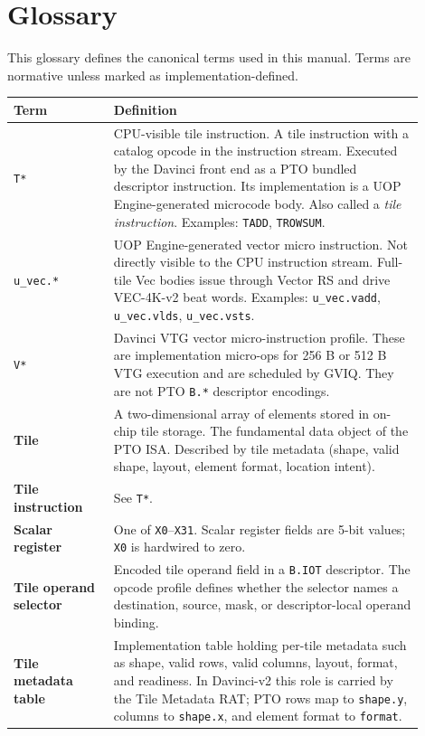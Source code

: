 \chapter{Glossary}
\label{chap:glossary}
\label{sec:glossary}
This glossary defines the canonical terms used in this manual. Terms are normative unless marked as implementation-defined.

\begin{longtable}{@{}L{0.22\linewidth}L{0.68\linewidth}@{}}
\toprule
Term & Definition \\
\midrule
\texttt{T*} & CPU-visible tile instruction. A tile instruction with a catalog opcode in the instruction stream. Executed by the Davinci front end as a PTO bundled descriptor instruction. Its implementation is a UOP Engine-generated microcode body. Also called a \textit{tile instruction}. Examples: \texttt{TADD}, \texttt{TROWSUM}. \\
\texttt{u\_vec.*} & UOP Engine-generated vector micro instruction. Not directly visible to the CPU instruction stream. Full-tile Vec bodies issue through Vector RS and drive VEC-4K-v2 beat words. Examples: \texttt{u\_vec.vadd}, \texttt{u\_vec.vlds}, \texttt{u\_vec.vsts}. \\
\texttt{V*} & Davinci VTG vector micro-instruction profile. These are implementation micro-ops for 256 B or 512 B VTG execution and are scheduled by GVIQ. They are not PTO \texttt{B.*} descriptor encodings. \\
\textbf{Tile} & A two-dimensional array of elements stored in on-chip tile storage. The fundamental data object of the PTO ISA. Described by tile metadata (shape, valid shape, layout, element format, location intent). \\
\textbf{Tile instruction} & See \texttt{T*}. \\
\textbf{Scalar register} & One of \texttt{X0}--\texttt{X31}. Scalar register fields are 5-bit values; \texttt{X0} is hardwired to zero. \\
\textbf{Tile operand selector} & Encoded tile operand field in a \texttt{B.IOT} descriptor. The opcode profile defines whether the selector names a destination, source, mask, or descriptor-local operand binding. \\
\textbf{Tile metadata table} & Implementation table holding per-tile metadata such as shape, valid rows, valid columns, layout, format, and readiness. In Davinci-v2 this role is carried by the Tile Metadata RAT; PTO rows map to \texttt{shape.y}, columns to \texttt{shape.x}, and element format to \texttt{format}. \\

\end{longtable}
